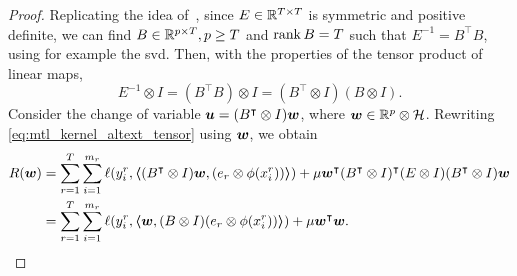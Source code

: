 \begin{proof}
    Replicating the idea of~\cite{EvgeniouMP05}, since ${E} \in \mathbb{R}^{T \times T}$ is symmetric and positive definite, we can find $B \in \mathbb{R}^{p \times T}, p \geq T$ and $\operatorname{rank}{B} = T$ such that $E^{-1} =
            {B^\intercal} {B}$, using for example the \acrshort{svd}.
    Then, with the properties of the tensor product of linear maps,  $$ E^{-1} \otimes I = (B^\intercal B) \otimes I = (B^\intercal \otimes I) (B \otimes I) . $$
    Consider the change of variable $\bm{u} = (B^\intercal \otimes I)\bm{w}$, where $\bm{w} \in \mathbb{R}^p \otimes \mathcal{H}$. %
    Rewriting \eqref{eq:mtl_kernel_altext_tensor} using $\bm{w}$, we obtain
    \begin{equation}
        \nonumber
        \begin{aligned}
            R(\bm{w}) & = \sum_{r=1}^{T} \sum_{i=1}^{m_r} \ell(y_i^r, \bm{\left\langle} (B^\intercal \otimes I) \bm{w},  (e_r \otimes \phi(x_i^r)) \bm{\right\rangle}) + \mu  \bm{w}^\intercal (B^\intercal \otimes I)^\intercal (E \otimes I) (B^\intercal \otimes I)\bm{w} \\
                         & = \sum_{r=1}^{T} \sum_{i=1}^{m_r} \ell(y_i^r, \bm{\left\langle} \bm{w}, (B \otimes I) (e_r \otimes \phi(x_i^r)) \bm{\right\rangle}) + \mu  \bm{w}^\intercal \bm{w} .                                                                               \\
        \end{aligned}
    \end{equation}


\end{proof}
